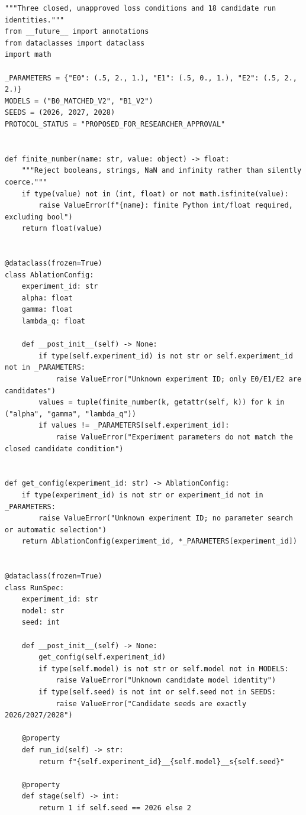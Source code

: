 \documentclass[UTF8,fontset=fandol,10pt]{ctexart}
\begin{document}
\begin{lstlisting}
"""Three closed, unapproved loss conditions and 18 candidate run identities."""
from __future__ import annotations
from dataclasses import dataclass
import math

_PARAMETERS = {"E0": (.5, 2., 1.), "E1": (.5, 0., 1.), "E2": (.5, 2., 2.)}
MODELS = ("B0_MATCHED_V2", "B1_V2")
SEEDS = (2026, 2027, 2028)
PROTOCOL_STATUS = "PROPOSED_FOR_RESEARCHER_APPROVAL"


def finite_number(name: str, value: object) -> float:
    """Reject booleans, strings, NaN and infinity rather than silently coerce."""
    if type(value) not in (int, float) or not math.isfinite(value):
        raise ValueError(f"{name}: finite Python int/float required, excluding bool")
    return float(value)


@dataclass(frozen=True)
class AblationConfig:
    experiment_id: str
    alpha: float
    gamma: float
    lambda_q: float

    def __post_init__(self) -> None:
        if type(self.experiment_id) is not str or self.experiment_id not in _PARAMETERS:
            raise ValueError("Unknown experiment ID; only E0/E1/E2 are candidates")
        values = tuple(finite_number(k, getattr(self, k)) for k in ("alpha", "gamma", "lambda_q"))
        if values != _PARAMETERS[self.experiment_id]:
            raise ValueError("Experiment parameters do not match the closed candidate condition")


def get_config(experiment_id: str) -> AblationConfig:
    if type(experiment_id) is not str or experiment_id not in _PARAMETERS:
        raise ValueError("Unknown experiment ID; no parameter search or automatic selection")
    return AblationConfig(experiment_id, *_PARAMETERS[experiment_id])


@dataclass(frozen=True)
class RunSpec:
    experiment_id: str
    model: str
    seed: int

    def __post_init__(self) -> None:
        get_config(self.experiment_id)
        if type(self.model) is not str or self.model not in MODELS:
            raise ValueError("Unknown candidate model identity")
        if type(self.seed) is not int or self.seed not in SEEDS:
            raise ValueError("Candidate seeds are exactly 2026/2027/2028")

    @property
    def run_id(self) -> str:
        return f"{self.experiment_id}__{self.model}__s{self.seed}"

    @property
    def stage(self) -> int:
        return 1 if self.seed == 2026 else 2



\end{lstlisting}
\end{document}
